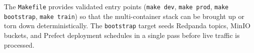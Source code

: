 \noindent The \texttt{Makefile} provides validated entry points (\texttt{make dev},
\texttt{make prod}, \texttt{make bootstrap}, \texttt{make train}) so that the
multi-container stack can be brought up or torn down deterministically. The
\texttt{bootstrap} target seeds Redpanda topics, MinIO buckets, and Prefect
deployment schedules in a single pass before live traffic is processed.
